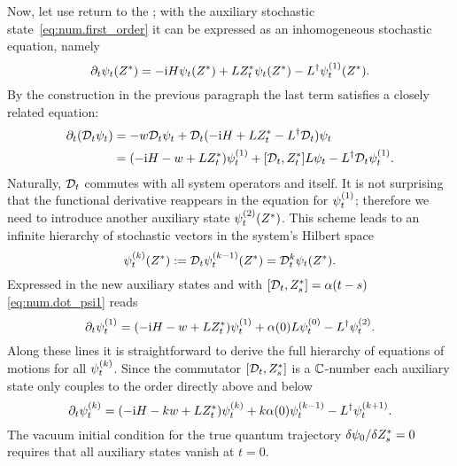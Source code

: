 Now, let use return to the \NMSSE; with the auxiliary stochastic state~\ref{eq:num.first_order} it can be expressed as an inhomogeneous stochastic equation, namely
\begin{equation*}
  \partial_t \psitZ = -\ii\Hsys\psitZ + L\ZZ_t\psitZ - \adj{L}\psitZ[1].
\end{equation*}
By the construction in the previous paragraph the last term satisfies a closely related equation:
\begin{align}
  \partial_t (\adjZZ_t \psi_t) &= - w \adjZZ_t\psi_t + \adjZZ_t ( -\ii\Hsys + L\ZZ_t - \adj{L} \adjZZ_t ) \psi_t \nonumber \\
  &= (-\ii\Hsys - w + L\ZZ_t) \psit[1] + [\adjZZ_t, \ZZ_t] L\psit - \adj{L} \adjZZ_t \psit[1].
  \label{eq:num.dot_psi1}
\end{align}
Naturally, $\mathcal{D}_t$ commutes with all system operators and itself.
It is not surprising that the functional derivative reappears in the equation for $\psit[1]$; therefore we need to introduce another auxiliary state $\psitZ[2]$.
This scheme leads to an infinite hierarchy of stochastic vectors in the system's Hilbert space
\begin{equation}
  \psitZ[k] := \adjZZ_t \psitZ[k-1] = \adjZZ_t^k \psitZ.
  \label{eq:num.auxiliary_states}
\end{equation}
Expressed in the new auxiliary states and with $[\mathcal{D}_t, {Z}^*_s] = \alpha(t-s)$ \autoref{eq:num.dot_psi1} reads
\begin{equation*}
  \partial_t \psit[1] = (-\ii\Hsys - w + L\ZZ_t) \psit[1] + \alpha(0) L\psit[0] - \adj{L}\psit[2].
\end{equation*}
Along these lines it is straightforward to derive the full hierarchy of equations of motions for all $\psit[k]$.
Since the commutator $[\mathcal{D}_t, {Z}^*_s]$ is a $\mathbb{C}$-number each auxiliary state only couples to the order directly above and below
\begin{equation}
  \partial_t\psit[k] = (-\ii\Hsys - kw + L\ZZ_t)\psit[k] + k \alpha(0) \psit[k-1] - \adj{L} \psit[k+1].
  \label{eq:num.hierarchy_lin}
\end{equation}
The vacuum initial condition for the true quantum trajectory $\delta \psi_0 / \delta {Z}^*_s = 0$ requires that all auxiliary states vanish at $t=0$.

